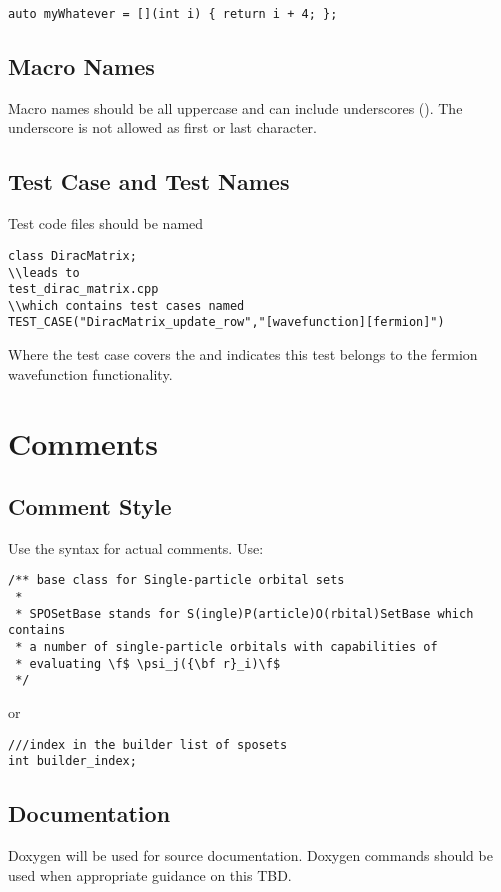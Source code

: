 \begin{lstlisting}[showspaces=false]
auto myWhatever = [](int i) { return i + 4; };
\end{lstlisting}

\subsection{Macro Names}
Macro names should be all uppercase and can include underscores (\inlinecode{_}).
The underscore is not allowed as first or last character.

\subsection{Test Case and Test Names}
Test code files should be named
\begin{lstlisting}[showspaces=false]
class DiracMatrix;
\\leads to
test_dirac_matrix.cpp
\\which contains test cases named
TEST_CASE("DiracMatrix_update_row","[wavefunction][fermion]")
\end{lstlisting}
Where the test case covers the  and  \inlinecode{[wavefunction][fermion]} indicates this test belongs to the fermion wavefunction functionality.

\section{Comments}
\subsection{Comment Style}
Use the  syntax for actual comments.
Use:
\begin{lstlisting}
/** base class for Single-particle orbital sets
 *
 * SPOSetBase stands for S(ingle)P(article)O(rbital)SetBase which contains
 * a number of single-particle orbitals with capabilities of
 * evaluating \f$ \psi_j({\bf r}_i)\f$
 */
\end{lstlisting}
or
\begin{lstlisting}
///index in the builder list of sposets
int builder_index;
\end{lstlisting}

\subsection{Documentation}
Doxygen will be used for source documentation. Doxygen commands should be used when appropriate guidance on this TBD.

